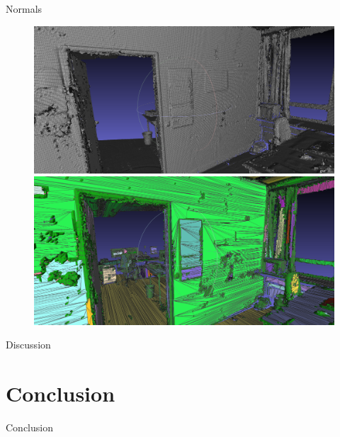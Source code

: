 \documentclass{beamer}
\begin{document}
\begin{frame}{Normals}
	\begin{figure}
   		\centering
   		\includegraphics[height=0.39\textheight]{police_mesh.png}\\
   		\vspace{0.1cm}
   		\includegraphics[height=0.39\textheight]{police_opt_mesh.png}
  	\end{figure}
\end{frame}

\begin{frame}{Discussion}
\end{frame}

\section{Conclusion}

\begin{frame}{Conclusion}
\end{frame}
\end{document}
